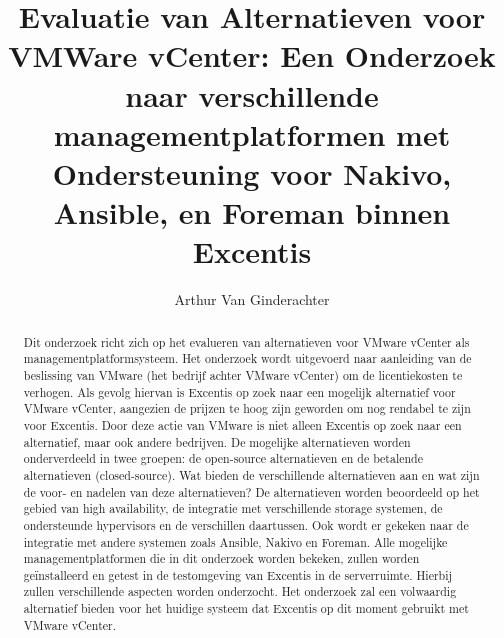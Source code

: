 \documentclass{hogent-article}
\title{Evaluatie van Alternatieven voor VMWare vCenter: Een Onderzoek naar verschillende managementplatformen met Ondersteuning voor Nakivo, Ansible, en Foreman binnen Excentis}
\author{Arthur Van Ginderachter}
\begin{document}
\begin{abstract}
Dit onderzoek richt zich op het evalueren van alternatieven voor VMware vCenter als managementplatformsysteem. Het onderzoek wordt uitgevoerd naar aanleiding van de beslissing van VMware (het bedrijf achter VMware vCenter) om de licentiekosten te verhogen. Als gevolg hiervan is Excentis op zoek naar een mogelijk alternatief voor VMware vCenter, aangezien de prijzen te hoog zijn geworden om nog rendabel te zijn voor Excentis. Door deze actie van VMware is niet alleen Excentis op zoek naar een alternatief, maar ook andere bedrijven.
De mogelijke alternatieven worden onderverdeeld in twee groepen: de open-source alternatieven en de betalende alternatieven (closed-source). Wat bieden de verschillende alternatieven aan en wat zijn de voor- en nadelen van deze alternatieven? De alternatieven worden beoordeeld op het gebied van high availability, de integratie met verschillende storage systemen, de ondersteunde hypervisors en de verschillen daartussen. Ook wordt er gekeken naar de integratie met andere systemen zoals Ansible, Nakivo en Foreman.
Alle mogelijke managementplatformen die in dit onderzoek worden bekeken, zullen worden geïnstalleerd en getest in de testomgeving van Excentis in de serverruimte. Hierbij zullen verschillende aspecten worden onderzocht. Het onderzoek zal een volwaardig alternatief bieden voor het huidige systeem dat Excentis op dit moment gebruikt met VMware vCenter.
\end{abstract}

\tableofcontents

\newpage  %
\printbibliography[heading=bibintoc]
\end{document}
